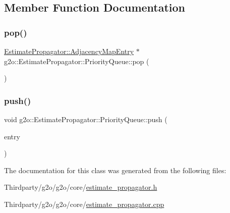 \subsection{Member Function Documentation}
\mbox{\label{classg2o_1_1_estimate_propagator_1_1_priority_queue_a82a20f1ebc44dfe305f65ceae7860a85}} 
\subsubsection{\texorpdfstring{pop()}{pop()}}
{\footnotesize\ttfamily \mbox{\hyperlink{classg2o_1_1_estimate_propagator_1_1_adjacency_map_entry}{Estimate\+Propagator\+::\+Adjacency\+Map\+Entry}} $\ast$ g2o\+::\+Estimate\+Propagator\+::\+Priority\+Queue\+::pop (\begin{DoxyParamCaption}{ }\end{DoxyParamCaption})}

\mbox{\label{classg2o_1_1_estimate_propagator_1_1_priority_queue_ac89681b92b921412ff432f14028f481e}} 
\subsubsection{\texorpdfstring{push()}{push()}}
{\footnotesize\ttfamily void g2o\+::\+Estimate\+Propagator\+::\+Priority\+Queue\+::push (\begin{DoxyParamCaption}\item[{\mbox{\hyperlink{classg2o_1_1_estimate_propagator_1_1_adjacency_map_entry}{Adjacency\+Map\+Entry}} $\ast$}]{entry }\end{DoxyParamCaption})}



The documentation for this class was generated from the following files\+:\begin{DoxyCompactItemize}
\item 
Thirdparty/g2o/g2o/core/\mbox{\hyperlink{estimate__propagator_8h}{estimate\+\_\+propagator.\+h}}\item 
Thirdparty/g2o/g2o/core/\mbox{\hyperlink{estimate__propagator_8cpp}{estimate\+\_\+propagator.\+cpp}}\end{DoxyCompactItemize}

